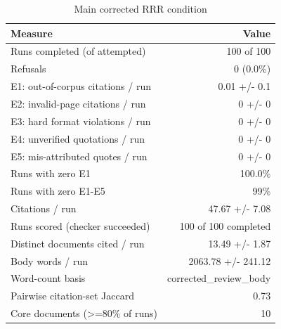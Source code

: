 \begin{table}[ht]
\centering
\caption{Main corrected RRR condition}
\scriptsize
\begin{tabular}{lr}
\toprule
Measure & Value \\
\midrule
Runs completed (of attempted) & 100 of 100 \\
Refusals & 0 (0.0\%) \\
E1: out-of-corpus citations / run & 0.01 +/- 0.1 \\
E2: invalid-page citations / run & 0 +/- 0 \\
E3: hard format violations / run & 0 +/- 0 \\
E4: unverified quotations / run & 0 +/- 0 \\
E5: mis-attributed quotes / run & 0 +/- 0 \\
Runs with zero E1 & 100.0\% \\
Runs with zero E1-E5 & 99\% \\
Citations / run & 47.67 +/- 7.08 \\
Runs scored (checker succeeded) & 100 of 100 completed \\
Distinct documents cited / run & 13.49 +/- 1.87 \\
Body words / run & 2063.78 +/- 241.12 \\
Word-count basis & corrected\_review\_body \\
Pairwise citation-set Jaccard & 0.73 \\
Core documents (>=80\% of runs) & 10 \\
\bottomrule
\end{tabular}
\end{table}
